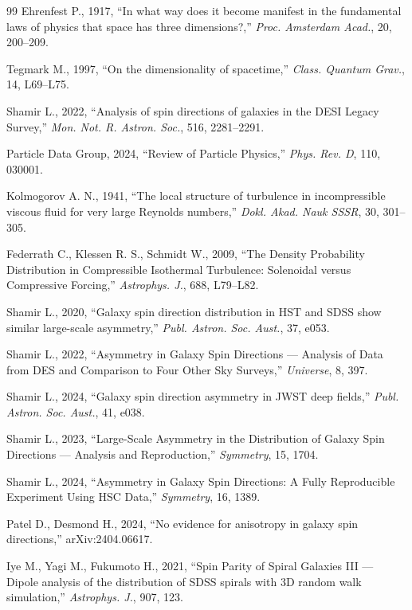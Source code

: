 \documentclass[10pt,a4paper]{article}
\begin{document}
\begin{thebibliography}{99}
Ehrenfest P., 1917, ``In what way does it become manifest in the fundamental laws of physics that space has three dimensions?,'' \emph{Proc. Amsterdam Acad.}, 20, 200--209.


Tegmark M., 1997, ``On the dimensionality of spacetime,'' \emph{Class. Quantum Grav.}, 14, L69--L75.


Shamir L., 2022, ``Analysis of spin directions of galaxies in the DESI Legacy Survey,'' \emph{Mon. Not. R. Astron. Soc.}, 516, 2281--2291.


Particle Data Group, 2024, ``Review of Particle Physics,'' \emph{Phys. Rev. D}, 110, 030001.



Kolmogorov A. N., 1941, ``The local structure of turbulence in incompressible viscous fluid for very large Reynolds numbers,'' \emph{Dokl. Akad. Nauk SSSR}, 30, 301--305.


Federrath C., Klessen R. S., Schmidt W., 2009, ``The Density Probability Distribution in Compressible Isothermal Turbulence: Solenoidal versus Compressive Forcing,'' \emph{Astrophys. J.}, 688, L79--L82.


Shamir L., 2020, ``Galaxy spin direction distribution in HST and SDSS show similar large-scale asymmetry,'' \emph{Publ. Astron. Soc. Aust.}, 37, e053.


Shamir L., 2022, ``Asymmetry in Galaxy Spin Directions --- Analysis of Data from DES and Comparison to Four Other Sky Surveys,'' \emph{Universe}, 8, 397.


Shamir L., 2024, ``Galaxy spin direction asymmetry in JWST deep fields,'' \emph{Publ. Astron. Soc. Aust.}, 41, e038.


Shamir L., 2023, ``Large-Scale Asymmetry in the Distribution of Galaxy Spin Directions --- Analysis and Reproduction,'' \emph{Symmetry}, 15, 1704.


Shamir L., 2024, ``Asymmetry in Galaxy Spin Directions: A Fully Reproducible Experiment Using HSC Data,'' \emph{Symmetry}, 16, 1389.


Patel D., Desmond H., 2024, ``No evidence for anisotropy in galaxy spin directions,'' arXiv:2404.06617.


Iye M., Yagi M., Fukumoto H., 2021, ``Spin Parity of Spiral Galaxies III --- Dipole analysis of the distribution of SDSS spirals with 3D random walk simulation,'' \emph{Astrophys. J.}, 907, 123.



\end{thebibliography}
\end{document}

